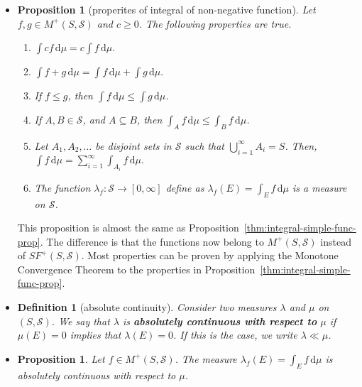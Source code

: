 \documentclass[10pt]{article}
\newtheorem{definition}[lemma]{Definition}
\newtheorem{proposition}[lemma]{Proposition}
\numberwithin{lemma}{section}
\newcommand{\dee}{\mathrm{d}}
\newcommand{\mcal}[1]{\mathcal{#1}}
\begin{document}
\begin{itemize}
  \item \begin{proposition}[properites of integral of non-negative function]
    Let $f,g \in M^+(S, \mcal{S})$ and $c \geq 0$. The following properties are true.
    \begin{enumerate}
      \item $\int cf\, \dee\mu = c \int f\, \dee\mu.$
      
      \item $\int f+g\, \dee\mu = \int f\, \dee\mu + \int g\, \dee\mu.$

      \item If $f \leq g$, then $\int f\, \dee\mu \leq \int g\, \dee\mu$.
      
      \item If $A,B \in \mcal{S}$, and $A \subseteq B$, then $\int_A f\,\dee\mu \leq \int_B f\,\dee\mu$.
      
      \item Let $A_1, A_2, \dotsc$ be disjoint sets in $\mcal{S}$ such that $\bigcup_{i=1}^\infty A_i = S$. Then, $\int f\, \dee\mu = \sum_{i=1}^\infty \int_{A_i} f\, \dee\mu.$
      
      \item The function $\lambda_f: \mcal{S} \rightarrow [0,\infty]$ define as $\lambda_f(E) = \int_E f\, \dee\mu$ is a measure on $\mcal{S}$.
    \end{enumerate}
  \end{proposition}
  This proposition is almost the same as Proposition~\ref{thm:integral-simple-func-prop}. The difference is that the functions now belong to $M^+(S,\mcal{S})$ instead of $SF^+(S,\mcal{S})$. Most properties can be proven by applying the Monotone Convergence Theorem to the properties in Proposition~\ref{thm:integral-simple-func-prop}.

  \item \begin{definition}[absolute continuity]
    Consider two measures $\lambda$ and $\mu$ on $(S,\mcal{S})$. We say that $\lambda$ is {\bf absolutely continuous with respect to} $\mu$ if $\mu(E) = 0$ implies that $\lambda(E) = 0$. If this is the case, we write $\lambda \ll \mu$.
  \end{definition}

  \item \begin{proposition} 
    Let $f \in M^+(S,\mcal{S})$. The measure $\lambda_f(E) = \int_E f\,\dee\mu$ is absolutely continuous with respect to $\mu$.  
  \end{proposition}


\end{itemize}
\end{document}
